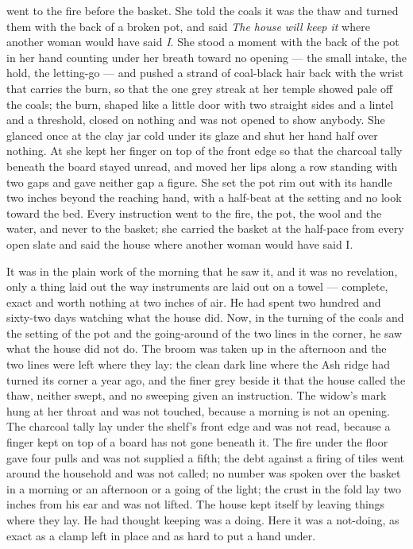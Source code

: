  went to the fire before the basket. She told the coals it was the thaw and turned them with the back of a broken pot, and said \emph{The house will keep it} where another woman would have said \emph{I}. She stood a moment with the back of the pot in her hand counting under her breath toward no opening --- the small intake, the hold, the letting-go --- and pushed a strand of coal-black hair back with the wrist that carries the burn, so that the one grey streak at her temple showed pale off the coals; the burn, shaped like a little door with two straight sides and a lintel and a threshold, closed on nothing and was not opened to show anybody. She glanced once at the clay jar cold under its glaze and shut her hand half over nothing. At  she kept her finger on top of the front edge so that the charcoal tally beneath the board stayed unread, and moved her lips along a row standing with two gaps and gave neither gap a figure. She set the pot rim out with its handle two inches beyond the reaching hand, with a half-beat at the setting and no look toward the bed. Every instruction went to the fire, the pot, the wool and the water, and never to the basket; she carried the basket at the half-pace from every open slate and said the house where another woman would have said I.

It was in the plain work of the morning that he saw it, and it was no revelation, only a thing laid out the way instruments are laid out on a towel --- complete, exact and worth nothing at two inches of air. He had spent two hundred and sixty-two days watching what the house did. Now, in the turning of the coals and the setting of the pot and the going-around of the two lines in the corner, he saw what the house did not do. The broom was taken up in the afternoon and the two lines were left where they lay: the clean dark line where the Ash ridge had turned its corner a year ago, and the finer grey beside it that the house called the thaw, neither swept, and no sweeping given an instruction. The widow's mark hung at her throat and was not touched, because a morning is not an opening. The charcoal tally lay under the shelf's front edge and was not read, because a finger kept on top of a board has not gone beneath it. The fire under the floor gave four pulls and was not supplied a fifth; the debt against a firing of tiles went around the household and was not called; no number was spoken over the basket in a morning or an afternoon or a going of the light; the crust in the fold lay two inches from his ear and was not lifted. The house kept itself by leaving things where they lay. He had thought keeping was a doing. Here it was a not-doing, as exact as a clamp left in place and as hard to put a hand under.

